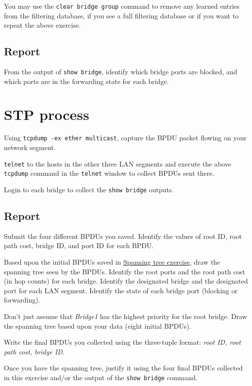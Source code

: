 \documentclass{../UTNetLab}
\begin{document}
    You may use the \lstinline[language={cisco}, emph={group}]{clear bridge group} command to remove any learned entries from the filtering database, if you see a full filtering database or if you want to repeat the above exercise.

    \subsection*{Report}
    From the output of \lstinline{show bridge}, identify which bridge ports are blocked, and which ports are in the forwarding state for each bridge.

\section{STP process}
    Using \lstinline{tcpdump -ex ether multicast}, capture the BPDU packet flowing on your network segment.

    \lstinline{telnet} to the hosts in the other three LAN segments and execute the above \lstinline{tcpdump} command in the \lstinline{telnet} window to collect BPDUs sent there.

    Login to each bridge to collect the \lstinline[language={cisco}]{show bridge} outputs.
    
    \subsection*{Report}
    Submit the four different BPDUs you saved.
    Identify the values of root ID, root path cost, bridge ID, and port ID for each BPDU.

    Based upon the initial BPDUs saved in \href{sec:spanning-tree}{Spanning tree exercise}, draw the spanning tree seen by the BPDUs. Identify the root ports and the root path cost (in hop counts) for each bridge.
    Identify the designated bridge and the designated port for each LAN segment.
    Identify the state of each bridge port (blocking or forwarding).

    Don’t just assume that \textit{Bridge1} has the highest priority for the root bridge.
    Draw the spanning tree based upon your data (eight initial BPDUs).

    Write the final BPDUs you collected using the three-tuple format: \textit{{root ID, root path cost, bridge ID}}.

    Once you have the spanning tree, justify it using the four final BPDUs collected in this exercise and/or the output of the \lstinline[language={cisco}]{show bridge} command.
\end{document}
